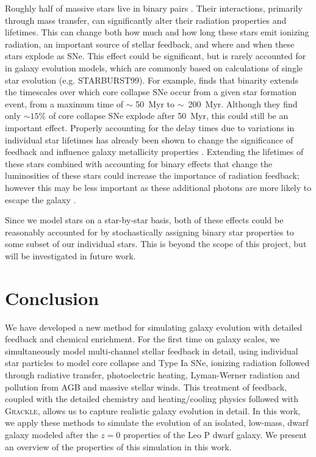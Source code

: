 Roughly half of massive stars live in binary pairs \citep{Sana2013}. Their interactions, primarily through mass transfer, can significantly alter their radiation properties and lifetimes. This can change both how much and how long these stars emit ionizing radiation, an important source of stellar feedback, and where and when these stars explode as SNe. This effect could be significant, but is rarely accounted for in galaxy evolution models, which are commonly based on calculations of single star evolution (e.g. STARBURST99). For example, \citet{Zapartas2017} finds that binarity extends the timescales over which core collapse SNe occur from a given star formation event, from a maximum time of $\sim$ 50~Myr to $\sim$~200~Myr. Although they find only $\sim 15\%$ of core collapse SNe explode after 50~Myr, this could still be an important effect. Properly accounting for the delay times due to variations in individual star lifetimes has already been shown to change the significance of feedback and influence galaxy metallicity properties \citep{Kimm2015}. Extending the lifetimes of these stars combined with accounting for binary effects that change the luminosities of these stars \citep{Gotberg2017,Gotberg2018} could increase the importance of radiation feedback; however this may be less important as these additional photons are more likely to escape the galaxy \citep[e.g.][]{Ma2016-binary}.

Since we model stars on a star-by-star basis, both of these effects could be reasonably accounted for by stochastically assigning binary star properties to some subset of our individual stars. This is beyond the scope of this project, but will be investigated in future work.

\section{Conclusion}
\label{ch1:sec:conclusion}
We have developed a new method for simulating galaxy evolution with detailed feedback and chemical enrichment. For the first time on galaxy scales, we simultaneously model multi-channel stellar feedback in detail, using individual star particles to model core collapse and Type Ia SNe, ionizing radiation followed through radiative transfer, photoelectric heating, Lyman-Werner radiation and pollution from AGB and massive stellar winds. This treatment of feedback, coupled with the detailed chemistry and heating/cooling physics followed with \textsc{Grackle}, allows us to capture realistic galaxy evolution in detail. In this work, we apply these methods to simulate the evolution of an isolated, low-mass, dwarf galaxy modeled after the $z=0$ properties of the Leo P dwarf galaxy. We present an overview of the properties of this simulation in this work.

